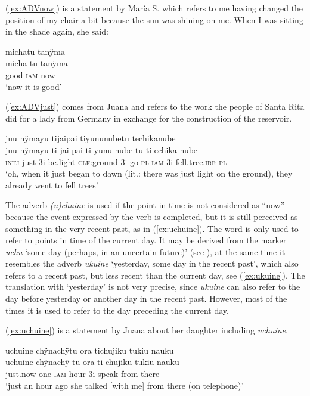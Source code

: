 (\ref{ex:ADVnow}) is a statement by María S. which refers to me having changed the position of my chair a bit because the sun was shining on me. When I was sitting in the shade again, she said:

\ea\label{ex:ADVnow}
\begingl
\glpreamble michatu tanÿma\\
\gla micha-tu tanÿma\\
\glb good-\textsc{iam} now\\
\glft ‘now it is good’
\endgl
\trailingcitation{[rxx-e181024l.019]}
\xe

(\ref{ex:ADVjust}) comes from Juana and refers to the work the people of Santa Rita did for a lady from Germany in exchange for the construction of the reservoir.

\ea\label{ex:ADVjust}
\begingl
\glpreamble juu nÿmayu tijaipai tiyununubetu techikanube\\
\gla juu nÿmayu ti-jai-pai ti-yunu-nube-tu ti-echika-nube\\
\glb \textsc{intj} just 3i-be.light-\textsc{clf:}ground 3i-go-\textsc{pl}-\textsc{iam} 3i-fell.tree.\textsc{irr}-\textsc{pl}\\
\glft ‘oh, when it just began to dawn (lit.: there was just light on the ground), they already went to fell trees’
\endgl
\trailingcitation{[jxx-p120515l-2.179]}
\xe

The adverb \textit{(u)chuine} is used if the point in time is not considered as “now” because the event expressed by the verb is completed, but it is still perceived as something in the very recent past, as in (\ref{ex:uchuine}). The word is only used to refer to points in time of the current day. It may be derived from the  marker \textit{uchu} ‘some day (perhaps, in an uncertain future)’ (see ), at the same time it resembles the adverb \textit{ukuine} ‘yesterday, some day in the recent past’, which also refers to a recent past, but less recent than the current day, see (\ref{ex:ukuine}). The translation with ‘yesterday’ is not very precise, since \textit{ukuine} can also refer to the day before yesterday or another day in the recent past. However, most of the times it is used to refer to the day preceding the current day.

(\ref{ex:uchuine}) is a statement by Juana about her daughter including \textit{uchuine}.

\ea\label{ex:uchuine}
\begingl
\glpreamble uchuine chÿnachÿtu ora tichujiku tukiu nauku\\
\gla uchuine chÿnachÿ-tu ora ti-chujiku tukiu nauku\\
\glb just.now one-\textsc{iam} hour 3i-speak from there\\
\glft ‘just an hour ago she talked [with me] from there (on telephone)’
\endgl
\trailingcitation{[jxx-p120430l-1.335-336]}
\xe

